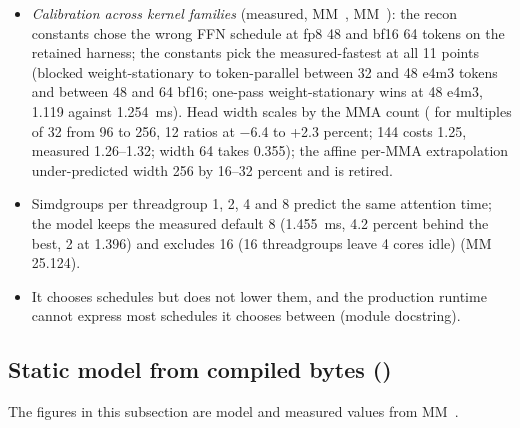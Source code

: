 \begin{itemize}
\item \emph{Calibration across kernel families} (measured, MM~, MM~): the recon constants chose the wrong FFN
  schedule at fp8 48 and bf16 64 tokens on the retained harness; the  constants pick the measured-fastest
  at all 11 points (blocked weight-stationary to token-parallel between 32 and 48 e4m3 tokens and between 48 and 64
  bf16; one-pass weight-stationary wins at 48 e4m3, 1.119 against 1.254~ms). Head width scales by the MMA count
  ( for multiples of 32 from 96 to 256, 12 ratios at −6.4 to +2.3 percent; 144 costs 1.25, measured 1.26–1.32;
  width 64 takes 0.355); the affine per-MMA extrapolation under-predicted width 256 by 16–32 percent and is retired.
\item Simdgroups per threadgroup 1, 2, 4 and 8 predict the same attention time; the model keeps the measured default 8
  (1.455~ms, 4.2 percent behind the best, 2 at 1.396) and excludes 16 (16 threadgroups leave 4 cores idle) (MM
  25.124).
\item It chooses schedules but does not lower them, and the production runtime cannot express most schedules it chooses between
  (module docstring).
\end{itemize}

\subsection*{Static model from compiled bytes ()}

The figures in this subsection are model and measured values from MM~.

